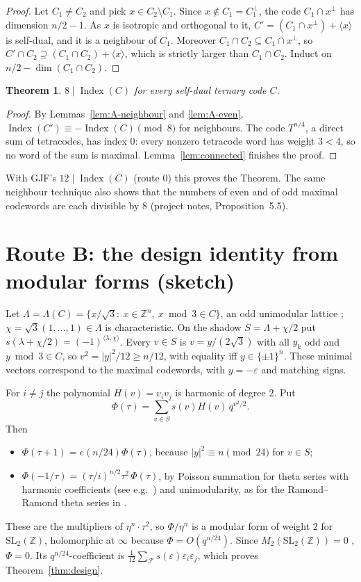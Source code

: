 \documentclass[11pt]{amsart}
\newtheorem{theorem}{Theorem}[section]
\theoremstyle{definition}
\newcommand{\Z}{\mathbb{Z}}
\newcommand{\Index}{\operatorname{Index}}
\newcommand{\cF}{\mathcal{F}}
\begin{document}
\begin{proof}
Let $C_1\ne C_2$ and pick $x\in C_2\setminus C_1$. Since $x\notin C_1=C_1^\perp$, the code
$C_1\cap x^\perp$ has dimension $n/2-1$. As $x$ is isotropic and orthogonal to it,
$C'=(C_1\cap x^\perp)+\langle x\rangle$ is self-dual, and it is a neighbour of $C_1$. Moreover
$C_1\cap C_2\subseteq C_1\cap x^\perp$, so $C'\cap C_2\supseteq(C_1\cap C_2)+\langle x\rangle$, which is
strictly larger than $C_1\cap C_2$. Induct on $n/2-\dim(C_1\cap C_2)$.
\end{proof}

\begin{theorem}\label{thm:A}
$8\mid\Index(C)$ for every self-dual ternary code $C$.
\end{theorem}

\begin{proof}
By Lemmas~\ref{lem:A-neighbour} and \ref{lem:A-even}, $\Index(C')\equiv-\Index(C)\pmod8$ for
neighbours. The code $T^{n/4}$, a direct sum of tetracodes, has index $0$: every nonzero tetracode
word has weight $3<4$, so no word of the sum is maximal. Lemma~\ref{lem:connected} finishes the
proof.
\end{proof}

With GJF's $12\mid\Index(C)$ (route 0) this proves the Theorem. The same neighbour technique also
shows that the numbers of even and of odd maximal codewords are each divisible by $8$ (project
notes, Proposition~5.5).

\section{Route B: the design identity from modular forms (sketch)}\label{sec:B}

Let $\Lambda=\Lambda(C)=\{x/\sqrt3:\ x\in\Z^n,\ x\bmod3\in C\}$, an odd unimodular lattice
\cite[\S2]{GJF}; $\chi=\sqrt3(1,\dots,1)\in\Lambda$ is characteristic. On the shadow
$S=\Lambda+\chi/2$ put $s(\lambda+\chi/2)=(-1)^{\langle\lambda,\chi\rangle}$. Every $v\in S$ is
$v=y/(2\sqrt3)$ with all $y_k$ odd and $y\bmod3\in C$, so $v^2=|y|^2/12\ge n/12$, with equality iff
$y\in\{\pm1\}^n$. These minimal vectors correspond to the maximal codewords, with
$y=-\varepsilon$ and matching signs.

For $i\ne j$ the polynomial $H(v)=v_iv_j$ is harmonic of degree $2$. Put
\[
  \Phi(\tau)=\sum_{v\in S}s(v)H(v)\,q^{v^2/2}.
\]
Then
\begin{itemize}
\item $\Phi(\tau+1)=e(n/24)\Phi(\tau)$, because $|y|^2\equiv n\pmod{24}$ for $v\in S$;
\item $\Phi(-1/\tau)=(\tau/i)^{n/2}\tau^2\,\Phi(\tau)$, by Poisson summation for theta series with
harmonic coefficients (see e.g.\ \cite{Eb}) and unimodularity, as for the Ramond--Ramond theta series
in \cite[Prop.~2.4]{GJF}.
\end{itemize}
These are the multipliers of $\eta^n\cdot\tau^2$, so $\Phi/\eta^n$ is a modular form of weight $2$
for $\mathrm{SL}_2(\Z)$, holomorphic at $\infty$ because $\Phi=O(q^{n/24})$. Since
$M_2(\mathrm{SL}_2(\Z))=0$ \cite[Ch.~VII]{Se}, $\Phi=0$. Its $q^{n/24}$-coefficient is
$\frac1{12}\sum_{\cF}s(\varepsilon)\varepsilon_i\varepsilon_j$, which proves Theorem~\ref{thm:design}.
\end{document}
